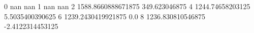 0 nan nan
1 nan nan
2 1588.8660888671875 349.623046875
4 1244.74658203125 5.5035400390625
6 1239.2430419921875 0.0
8 1236.830810546875 -2.4122314453125
